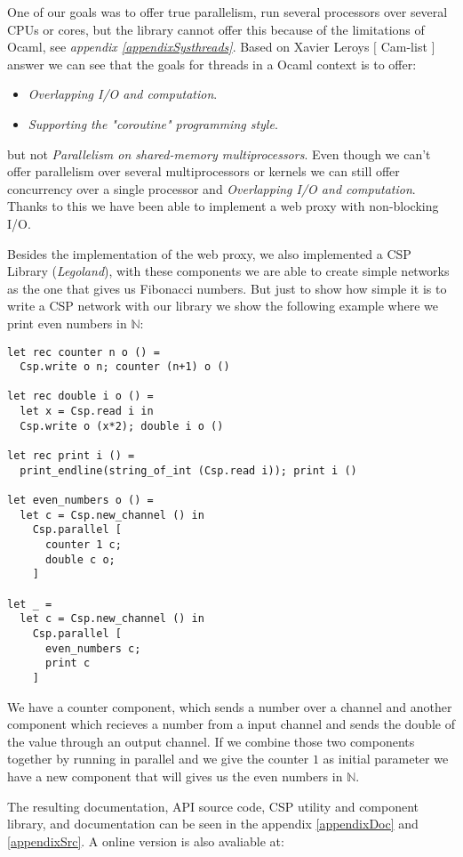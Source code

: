 \documentclass[a4paper,12pt]{article}
\begin{document}
One of our goals was to offer true parallelism, run several processors
over several CPUs or cores, but the library cannot offer this because of the
limitations of Ocaml, see {\it appendix \ref{appendixSysthreads}}. Based on
Xavier Leroys $[$ Cam-list $]$ answer we can see that the goals for threads in a
Ocaml context is to offer:
\begin{itemize}
 \item {\it Overlapping I/O and computation}.
 \item {\it Supporting the "coroutine" programming style}.
\end{itemize}
but not {\it Parallelism on shared-memory multiprocessors}. Even though we can't
offer parallelism over several multiprocessors or kernels we can still offer
concurrency over a single processor and {\it Overlapping I/O and computation}.
Thanks to this we have been able to implement a web proxy with non-blocking I/O.

Besides the implementation of the web proxy, we also implemented a CSP Library
({\it Legoland\cite{vintercsp}}), with these components we are able to create
simple networks as the one that gives us Fibonacci numbers. But just to show how
simple it is to write a CSP network with our library we show the following example
where we print even numbers in $\mathbb{N}$:
\newpage
\begin{verbatim}
let rec counter n o () =
  Csp.write o n; counter (n+1) o ()

let rec double i o () =
  let x = Csp.read i in
  Csp.write o (x*2); double i o ()

let rec print i () =
  print_endline(string_of_int (Csp.read i)); print i ()

let even_numbers o () =
  let c = Csp.new_channel () in
    Csp.parallel [
      counter 1 c;
      double c o;
    ]

let _ =
  let c = Csp.new_channel () in
    Csp.parallel [
      even_numbers c;
      print c
    ]
\end{verbatim}
We have a counter component, which sends a number over a channel and another
component which recieves a number from a input channel and sends the
double of the value through an output channel. If we combine those two
components together by running in parallel and we give the counter $1$ as
initial parameter we have a new component that will gives us the even numbers in
$\mathbb{N}$.

The resulting documentation, API source code, CSP utility and component library,
and documentation can be seen in the appendix \ref{appendixDoc} and
\ref{appendixSrc}. A online version is also avaliable at:
\end{document}
